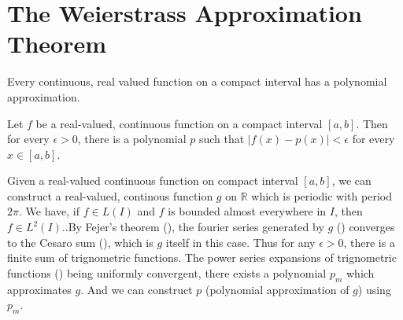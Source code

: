 \section{The Weierstrass Approximation Theorem}
	Every continuous, real valued function on a compact interval has a polynomial approximation.\cite[Theorem 11.17]{apostol}
	\begin{theorem}[Weierstrass]
		Let $f$ be a real-valued, continuous function on a compact interval $[a,b]$. Then for every \(\epsilon > 0\), there is a polynomial $p$ such that \(|f(x)-p(x)| < \epsilon\) for every \(x \in [a,b]\).
	\end{theorem}
	\begin{synopsis}
		Given a real-valued continuous function on compact interval $[a,b]$, we can construct a real-valued, continous function $g$ on $\mathbb{R}$ which is periodic with period $2\pi$. We have, if \(f \in L(I)\) and $f$ is bounded almost everywhere in $I$, then \(f \in L^2(I)\).\cite[Theorem 10.52]{apostol}.By Fejer's theorem (\cite[Theorem 11.15]{apostol}), the fourier series generated by $g$ (\cite[definition 11.3]{apostol}) converges to the Cesaro sum (\cite[Definition 8.47]{apostol}), which is $g$ itself in this case. Thus for any \(\epsilon > 0\), there is a finite sum of trignometric functions. The power series expansions of trignometric functions (\cite[definition 9.27]{apostol}) being uniformly convergent, there exists a polynomial $p_m$ which approximates $g$. And we can construct $p$ (polynomial approximation of $g$) using $p_m$.
	\end{synopsis}
